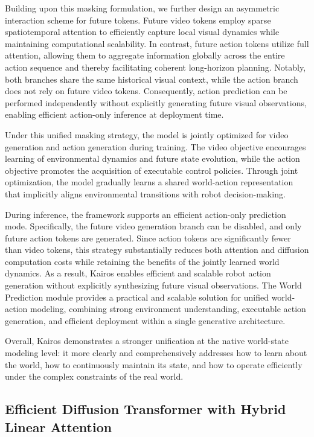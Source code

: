 \documentclass{llmxive}
\begin{document}
Building upon this masking formulation, we further design an asymmetric interaction scheme for future tokens. Future video tokens employ sparse spatiotemporal attention to efficiently capture local visual dynamics while maintaining computational scalability. In contrast, future action tokens utilize full attention, allowing them to aggregate information globally across the entire action sequence and thereby facilitating coherent long-horizon planning. Notably, both branches share the same historical visual context, while the action branch does not rely on future video tokens. Consequently, action prediction can be performed independently without explicitly generating future visual observations, enabling efficient action-only inference at deployment time.


Under this unified masking strategy, the model is jointly optimized for video generation and action generation during training. The video objective encourages learning of environmental dynamics and future state evolution, while the action objective promotes the acquisition of executable control policies. Through joint optimization, the model gradually learns a shared world-action representation that implicitly aligns environmental transitions with robot decision-making.

During inference, the framework supports an efficient action-only prediction mode. Specifically, the future video generation branch can be disabled, and only future action tokens are generated. Since action tokens are significantly fewer than video tokens, this strategy substantially reduces both attention and diffusion computation costs while retaining the benefits of the jointly learned world dynamics. As a result, Kairos enables efficient and scalable robot action generation without explicitly synthesizing future visual observations.
The World Prediction module provides a practical and scalable solution for unified world-action modeling, combining strong environment understanding, executable action generation, and efficient deployment within a single generative architecture.


Overall, Kairos demonstrates a stronger unification at the native world-state modeling level: it more clearly and comprehensively addresses how to learn about the world, how to continuously maintain its state, and how to operate efficiently under the complex constraints of the real world.




\subsection{Efficient Diffusion Transformer with Hybrid Linear Attention}\label{sec:attention}
\end{document}
